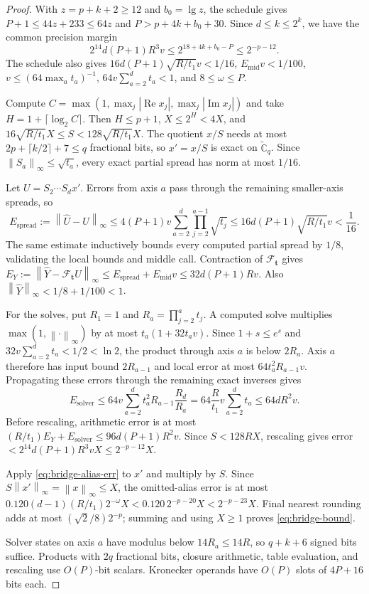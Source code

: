 \documentclass[11pt]{article}
\theoremstyle{definition}
\newcommand{\Cg}{\widetilde{\mathbb{C}}}
\newcommand{\cF}{\mathcal{F}}
\newcommand{\norm}[1]{\left\lVert #1 \right\rVert}
\newcommand{\abs}[1]{\left\lvert #1 \right\rvert}
\begin{document}
\begin{proof}
With $z=p+k+2\ge12$ and $b_0=\lg z$, the schedule gives
$P+1\le44z+233\le64z$ and $P>p+4k+b_0+30$.
Since $d\le k\le2^k$, we have the common precision margin
\[
 2^{14}d(P+1)R^3v
 \le2^{18+4k+b_0-P}\le2^{-p-12}.
\]
The schedule also gives $16d(P+1)\sqrt{R/t_1}v<1/16$,
$E_{\mathrm{mid}}v<1/100$, $v\le(64\max_at_a)^{-1}$,
$64v\sum_{a=2}^dt_a<1$, and $8\le\omega\le P$.

Compute $C=\max(1,\max_j\abs{\operatorname{Re}x_j},
\max_j\abs{\operatorname{Im}x_j})$ and take $H=1+\lceil\log_2C\rceil$.
Then $H\le p+1$, $X\le2^H<4X$, and
$16\sqrt{R/t_1}X\le S<128\sqrt{R/t_1}X$.
The quotient $x/S$ needs at most $2p+\lceil k/2\rceil+7\le q$ fractional
bits, so $x'=x/S$ is exact on $\Cg_q$.
Since $\norm{S_a}_\infty\le\sqrt{t_a}$, every exact partial spread has norm
at most $1/16$.

Let $U=S_2\cdots S_dx'$.
Errors from axis $a$ pass through the remaining smaller-axis spreads, so
\[
 E_{\mathrm{spread}}:=\norm{\widehat U-U}_\infty
 \le4(P+1)v\sum_{a=2}^d\prod_{j=2}^{a-1}\sqrt{t_j}
 \le16d(P+1)\sqrt{R/t_1}v<\frac1{16}.
\]
The same estimate inductively bounds every computed partial spread by $1/8$,
validating the local bounds and middle call.
Contraction of $\cF_{\mathbf t}$ gives
$E_Y:=\norm{\widehat Y-\cF_{\mathbf t}U}_\infty
\le E_{\mathrm{spread}}+E_{\mathrm{mid}}v\le32d(P+1)Rv$.
Also $\norm{\widehat Y}_\infty<1/8+1/100<1$.

For the solves, put $R_1=1$ and $R_a=\prod_{j=2}^at_j$.
A computed solve multiplies $\max(1,\norm{\cdot}_\infty)$ by at most
$t_a(1+32t_av)$.
Since $1+s\le e^s$ and $32v\sum_{a=2}^dt_a<1/2<\ln2$, the product
through axis $a$ is below $2R_a$.
Axis $a$ therefore has input bound $2R_{a-1}$ and local error at most
$64t_a^2R_{a-1}v$.
Propagating these errors through the remaining exact inverses gives
\[
 E_{\mathrm{solver}}
 \le64v\sum_{a=2}^dt_a^2R_{a-1}\frac{R_d}{R_a}
 =64\frac{R}{t_1}v\sum_{a=2}^dt_a
 \le64dR^2v.
\]
Before rescaling, arithmetic error is at most
$(R/t_1)E_Y+E_{\mathrm{solver}}\le96d(P+1)R^2v$.
Since $S<128RX$, rescaling gives error
$<2^{14}d(P+1)R^3vX\le2^{-p-12}X$.

Apply \eqref{eq:bridge-alias-err} to $x'$ and multiply by $S$.
Since $S\norm{x'}_\infty=\norm{x}_\infty\le X$, the omitted-alias error is
at most $0.120(d-1)(R/t_1)2^{-\omega}X
<0.120\,2^{-p-20}X<2^{-p-23}X$.
Final nearest rounding adds at most $(\sqrt2/8)2^{-p}$;
summing and using $X\ge1$ proves \eqref{eq:bridge-bound}.

Solver states on axis $a$ have modulus below $14R_a\le14R$,
so $q+k+6$ signed bits suffice.
Products with $2q$ fractional bits, closure arithmetic, table evaluation,
and rescaling use $O(P)$-bit scalars.
Kronecker operands have $O(P)$ slots of $4P+16$ bits each.
\end{proof}
\end{document}
